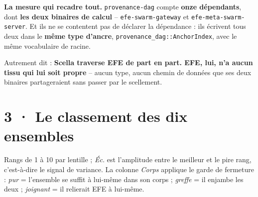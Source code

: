 \documentclass[10pt]{article}
\newcommand{\code}[1]{\texttt{\small #1}}
\begin{document}
\begin{acquis}
\textbf{La mesure qui recadre tout.} \code{provenance-dag} compte \textbf{onze dépendants}, dont
\textbf{les deux binaires de calcul} -- \code{efe-swarm-gateway} et \code{efe-meta-swarm-server}. Et ils
ne se contentent pas de déclarer la dépendance : ils écrivent tous deux dans le \textbf{même type
d'ancre}, \code{provenance\_dag::AnchorIndex}, avec le même vocabulaire de racine.

Autrement dit : \textbf{Scella traverse EFE de part en part. EFE, lui, n'a aucun tissu qui lui soit
propre} -- aucun type, aucun chemin de données que ses deux binaires partageraient sans passer par le
scellement.
\end{acquis}

\section{3 · Le classement des dix ensembles}

Rangs de 1 à 10 par lentille ; \emph{Éc.} est l'amplitude entre le meilleur et le pire rang, c'est-à-dire
le signal de variance. La colonne \emph{Corps} applique le garde de fermeture : \emph{pur} = l'ensemble
se suffit à lui-même dans son corps ; \emph{greffe} = il enjambe les deux ; \emph{joignant} = il
relierait EFE à lui-même.
\end{document}
